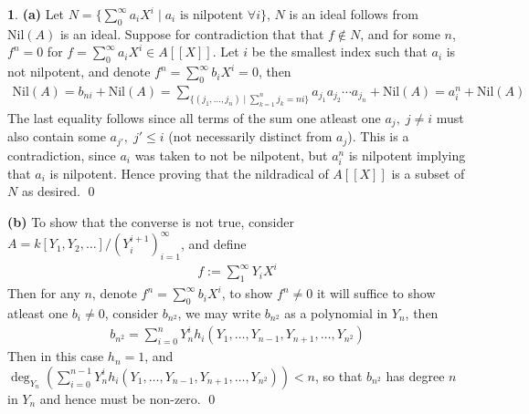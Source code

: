 \documentclass[11pt]{article}
\theoremstyle{definition}
\newtheorem{pb}{}
\newcommand{\set}[1]{\{#1\}}
\begin{document}
    \begin{pb}
        \textbf{(a)} Let \(N = \set{\sum_0^\infty a_iX^i \mid a_i \text{ is nilpotent } \forall i}\), \(N\) is an ideal follows from \(\text{Nil}(A)\) is an ideal. Suppose for contradiction that that \(f \not \in N\), and for some \(n\), \(f^n = 0\) for \(f = \sum_0^\infty a_iX^i \in A[[X]]\). Let \(i\) be the smallest index such that \(a_i\) is not nilpotent, and denote \(f^n = \sum_0^\infty b_iX^i = 0\), then 
        \begin{align*}
            \text{Nil}(A) = b_{ni} + \text{Nil}(A) = \sum_{\set{(j_1,\hdots,j_n) \mid \sum_{k=1}^n j_k = ni}} a_{j_1}a_{j_2}\cdots a_{j_n}  + \text{Nil}(A) = a_i^n + \text{Nil}(A)
        \end{align*}
        The last equality follows since all terms of the sum one atleast one \(a_j, \; j \neq i\) must also contain some \(a_{j'}, \; j' \leq i\) (not necessarily distinct from \(a_j\)).
        This is a contradiction, since \(a_i\) was taken to not be nilpotent, but \(a_i^n\) is nilpotent implying that \(a_i\) is nilpotent. Hence proving that the nildradical of \(A[[X]]\) is a subset of \(N\) as desired. \qed


        \textbf{(b)} To show that the converse is not true, consider \(A = k[Y_1,Y_2,\hdots]/(Y_i^{i+1})_{i=1}^\infty\), and define
        \begin{align*}
            f := \sum_1^\infty Y_iX^i
        \end{align*}
        Then for any \(n\), denote \(f^n = \sum_0^\infty b_iX^i\), to show \(f^n \neq 0\) it will suffice to show atleast one \(b_i \neq 0\), consider \(b_{n^2}\), we may write \(b_{n^2}\) as a polynomial in \(Y_n\), then
        \begin{align*}
            b_{n^2} = \sum_{i=0}^n Y_n^i h_i(Y_1,\hdots,Y_{n-1},Y_{n+1},\hdots,Y_{n^2})
        \end{align*}
        Then in this case \(h_n = 1\), and \(\deg_{Y_n}(\sum_{i=0}^{n-1} Y_n^i h_i(Y_1,\hdots,Y_{n-1},Y_{n+1},\hdots,Y_{n^2})) < n\), so that \(b_{n^2}\) has degree \(n\) in \(Y_n\) and hence must be non-zero. \qed
    \end{pb}
\end{document}

